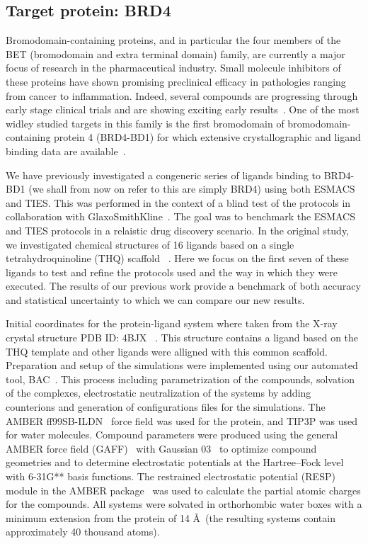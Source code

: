\subsection{Target protein: BRD4}

Bromodomain-containing proteins, and in particular the four members of the 
BET (bromodomain and extra terminal domain) family, are currently a major 
focus of research in the pharmaceutical industry.
Small molecule inhibitors of these proteins have shown promising preclinical 
efficacy in pathologies ranging from cancer to inflammation. 
Indeed, several compounds are progressing through early stage clinical  
trials and are showing exciting early results~\cite{Theodoulou2016}. 
One of the most widley studied targets in this family is the first 
bromodomain of bromodomain-containing protein 4 (BRD4-BD1) for which  
extensive crystallographic and ligand binding data are available~\cite{Chung2011, Bamborough2012, Chung2012}.

We have previously investigated a congeneric series of ligands binding to 
BRD4-BD1 (we shall from now on refer to this are simply BRD4) using both 
ESMACS and TIES.
This was performed in the context of a blind test of the protocols in 
collaboration with GlaxoSmithKline~\cite{Wan2017brd4}.
The goal was to benchmark the ESMACS and TIES protocols in a relaistic drug discovery scenario.
In the original study, we investigated chemical structures of 16 ligands based on a single tetrahydroquinoline (THQ) scaffold ~\cite{Gosmini2014}.
Here we focus on the first seven of these ligands to test and refine 
the protocols used and the way in which they were executed.
The results of our previous work provide a benchmark of both accuracy and 
statistical uncertainty to which we can compare our new results.

Initial coordinates for the protein-ligand system where taken from the X-ray crystal structure PDB ID: 4BJX ~\cite{Wyce2013}.
This structure contains a ligand based on the THQ template and other ligands were alligned with this common scaffold.
Preparation and setup of the simulations were implemented using 
our automated tool, BAC~\cite{Sadiq2008}.
This process including parametrization of the compounds, solvation of the complexes, electrostatic neutralization of the systems by adding counterions and generation of configurations files for the simulations. 
The AMBER ff99SB-ILDN~\cite{Lindorff-Larsen2010} force field was used for the protein, and TIP3P was used for water molecules. 
Compound parameters were produced using the general AMBER force field (GAFF)~\cite{Wang2004} with Gaussian 03~\cite{Frisch} to optimize compound geometries and to determine electrostatic potentials at the Hartree–Fock level with 6-31G** basis functions. 
The restrained electrostatic potential (RESP) module in the AMBER package~\cite{Case2005} was used to calculate the partial atomic charges for the compounds. 
All systems were solvated in orthorhombic water boxes with a minimum extension from the protein of 14 \AA\ (the resulting systems contain approximately 40 thousand atoms).
